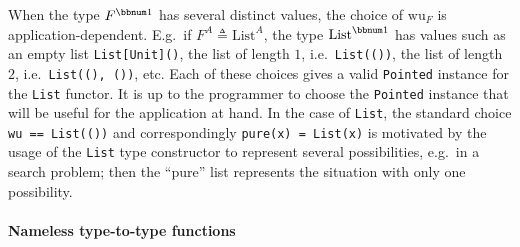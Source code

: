 When the type $F^{\bbnum 1}$ has several distinct values, the choice
of $\text{wu}_{F}$ is application-dependent. E.g.~if $F^{A}\triangleq\text{List}^{A}$,
the type $\text{List}^{\bbnum 1}$ has values such as an empty list
\lstinline!List[Unit]()!, the list of length $1$, i.e.~\lstinline!List(())!,
the list of length $2$, i.e.~\lstinline!List((), ())!, etc. Each
of these choices gives a valid \lstinline!Pointed! instance for the
\lstinline!List! functor. It is up to the programmer to choose the
\lstinline!Pointed! instance that will be useful for the application
at hand. In the case of \lstinline!List!, the standard choice \lstinline!wu == List(())!
and correspondingly \lstinline!pure(x) = List(x)! is motivated by
the usage of the \lstinline!List! type constructor to represent several
possibilities, e.g.~in a search problem; then the ``pure'' list
represents the situation with only one possibility.

\paragraph{Nameless type-to-type functions}

